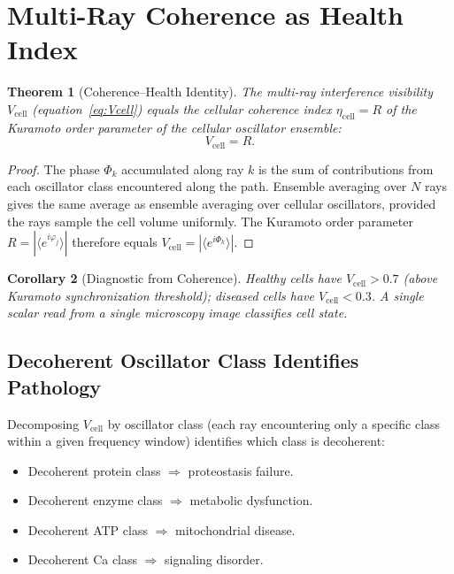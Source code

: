 \documentclass[twocolumn,10pt,a4paper]{article}
\newtheorem{theorem}{Theorem}[section]
\newtheorem{corollary}[theorem]{Corollary}
\theoremstyle{definition}
\theoremstyle{remark}
\begin{document}
\section{Multi-Ray Coherence as Health Index}

\begin{theorem}[Coherence--Health Identity]
The multi-ray interference visibility $V_{\mathrm{cell}}$ (equation~\ref{eq:Vcell}) equals the cellular coherence index $\eta_{\mathrm{cell}} = R$ of the Kuramoto order parameter of the cellular oscillator ensemble:
\begin{equation}
    V_{\mathrm{cell}} = R.
\end{equation}
\end{theorem}

\begin{proof}
The phase $\Phi_k$ accumulated along ray $k$ is the sum of contributions from each oscillator class encountered along the path. Ensemble averaging over $N$ rays gives the same average as ensemble averaging over cellular oscillators, provided the rays sample the cell volume uniformly. The Kuramoto order parameter $R = |\langle e^{i\varphi_j}\rangle|$ therefore equals $V_{\mathrm{cell}} = |\langle e^{i\Phi_k}\rangle|$.
\end{proof}

\begin{corollary}[Diagnostic from Coherence]
Healthy cells have $V_{\mathrm{cell}} > 0.7$ (above Kuramoto synchronization threshold); diseased cells have $V_{\mathrm{cell}} < 0.3$. A single scalar read from a single microscopy image classifies cell state.
\end{corollary}

\subsection{Decoherent Oscillator Class Identifies Pathology}

Decomposing $V_{\mathrm{cell}}$ by oscillator class (each ray encountering only a specific class within a given frequency window) identifies which class is decoherent:
\begin{itemize}[leftmargin=*,nosep]
    \item Decoherent protein class $\Rightarrow$ proteostasis failure.
    \item Decoherent enzyme class $\Rightarrow$ metabolic dysfunction.
    \item Decoherent ATP class $\Rightarrow$ mitochondrial disease.
    \item Decoherent Ca class $\Rightarrow$ signaling disorder.
\end{itemize}
\end{document}
